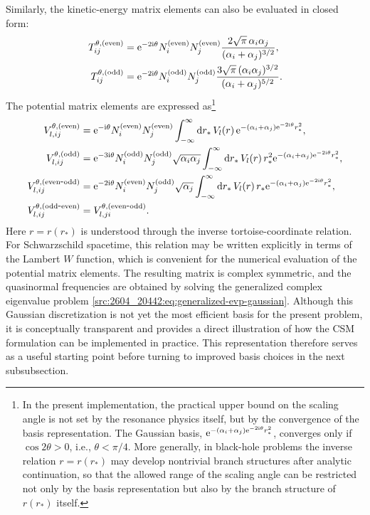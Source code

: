 Similarly, the kinetic-energy matrix elements can also be evaluated in closed
form:
\begin{align}
    T_{ij}^{\theta,\mathrm{(even)}}
    &= \mathrm{e}^{-2\mathrm{i}\theta} N^{\mathrm{(even)}}_i N^{\mathrm{(even)}}_j
    \frac{ 2\sqrt{\pi}\,\alpha_i\alpha_j }{ (\alpha_i+\alpha_j)^{3/2} },
    \\
    T_{ij}^{\theta,\mathrm{(odd)}}
    &=
    \mathrm{e}^{-2\mathrm{i}\theta} N^{\mathrm{(odd)}}_i N^{\mathrm{(odd)}}_j
    \frac{ 3\sqrt{\pi}\,(\alpha_i\alpha_j)^{3/2} }{ (\alpha_i+\alpha_j)^{5/2} }.
\end{align}
The potential matrix elements are expressed as\footnote{%
In the present implementation, the practical upper bound on the scaling angle is not set by the resonance physics itself, but by the convergence of the basis representation.
The Gaussian basis, $\mathrm{e}^{- (\alpha_i+\alpha_j) \mathrm{e}^{-2 \mathrm{i} \theta} r_*^2}$, converges only if $\cos2\theta>0$, i.e., $\theta<\pi/4$.
More generally, in black-hole problems the inverse relation $r=r(r_*)$ may develop nontrivial branch structures after analytic continuation, so that the allowed range of the scaling angle can be restricted not only by the basis representation but also by the branch structure of $r(r_*)$ itself.}
\begin{align}
    V_{l,ij}^{\theta,\mathrm{(even)}}
    &= \mathrm{e}^{-\mathrm{i}\theta} N^{\mathrm{(even)}}_i N^{\mathrm{(even)}}_j
    \int_{-\infty}^{\infty} \mathrm{d} r_*\,
    V_l(r)\, \mathrm{e}^{-(\alpha_i+\alpha_j)\mathrm{e}^{-2\mathrm{i}\theta}r_*^2},
    \\
    V_{l,ij}^{\theta,\mathrm{(odd)}}
    &= \mathrm{e}^{-3\mathrm{i}\theta} N^{\mathrm{(odd)}}_i N^{\mathrm{(odd)}}_j
    \sqrt{\alpha_i\alpha_j}\int_{-\infty}^{\infty} \mathrm{d} r_*\,
    V_l(r)\, r_*^2 \mathrm{e}^{-(\alpha_i+\alpha_j)\mathrm{e}^{-2\mathrm{i}\theta}r_*^2},
    \\
    V_{l,ij}^{\theta,\mathrm{(even\mbox{-}odd)}}
    &= \mathrm{e}^{-2\mathrm{i}\theta} N^{\mathrm{(even)}}_i N^{\mathrm{(odd)}}_j
    \sqrt{\alpha_j}\int_{-\infty}^{\infty} \mathrm{d} r_*\,
    V_l(r)\, r_* \mathrm{e}^{-(\alpha_i+\alpha_j)\mathrm{e}^{-2\mathrm{i}\theta}r_*^2},
    \\
    V_{l,ij}^{\theta,\mathrm{(odd\mbox{-}even)}}
    &= V_{l,ji}^{\theta,\mathrm{(even\mbox{-}odd)}}.
\end{align}
Here $r=r(r_*)$ is understood through the inverse tortoise-coordinate relation.
For Schwarzschild spacetime, this relation may be written explicitly in terms
of the Lambert $W$ function, which is convenient for the numerical evaluation
of the potential matrix elements.
The resulting matrix is complex symmetric, and the quasinormal frequencies are
obtained by solving the generalized complex eigenvalue problem
\eqref{src:2604_20442:eq:generalized-evp-gaussian}.
Although this Gaussian discretization is not yet the most efficient basis for
the present problem, it is conceptually transparent and provides a direct
illustration of how the CSM formulation can be implemented in practice.
This representation therefore serves as a useful starting point before turning
to improved basis choices in the next subsubsection.
